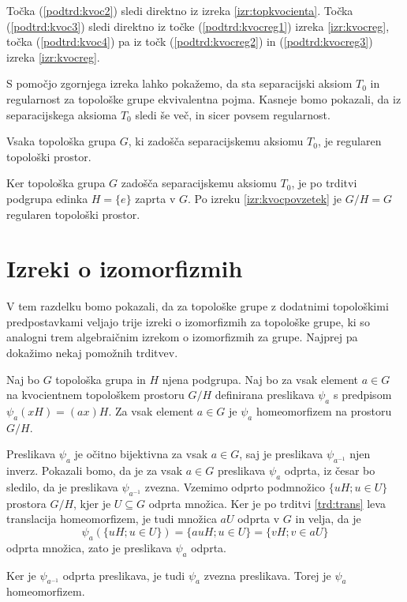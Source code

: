 \documentclass[mat1]{fmfdelo}
\begin{document}
\begin{dokaz}
Točka (\ref{podtrd:kvoc2}) sledi direktno iz izreka \ref{izr:topkvocienta}.
Točka (\ref{podtrd:kvoc3}) sledi direktno iz točke (\ref{podtrd:kvocreg1}) izreka \ref{izr:kvocreg}, točka (\ref{podtrd:kvoc4}) pa iz točk (\ref{podtrd:kvocreg2}) in (\ref{podtrd:kvocreg3}) izreka \ref{izr:kvocreg}.
\end{dokaz}

S pomočjo zgornjega izreka lahko pokažemo, da sta separacijski aksiom $T_0$ in regularnost za topološke grupe ekvivalentna pojma. Kasneje bomo pokazali, da iz separacijskega aksioma $T_0$ sledi še več, in sicer povsem regularnost.

\begin{posledica}\label{izr:t3}
	Vsaka topološka grupa $G$, ki zadošča separacijskemu aksiomu $T_0$, je regularen topološki prostor.
\end{posledica}

\begin{dokaz}
Ker topološka grupa $G$ zadošča separacijskemu aksiomu $T_0$, je po trditvi podgrupa edinka $H = \lbrace e \rbrace$ zaprta v $G$. Po izreku \ref{izr:kvocpovzetek} je $G/H = G$ regularen topološki prostor.
\end{dokaz}

\section{Izreki o izomorfizmih}
V tem razdelku bomo pokazali, da za topološke grupe z dodatnimi topološkimi predpostavkami veljajo trije izreki o izomorfizmih za topološke grupe, ki so analogni trem algebraičnim izrekom o izomorfizmih za grupe. Najprej pa dokažimo nekaj pomožnih trditvev.

\begin{trditev}\label{trd:homogenkvoc}
	Naj bo $G$ topološka grupa in $H$ njena podgrupa. Naj bo za vsak element $a \in G$ na kvocientnem topološkem prostoru $G/H$ definirana preslikava $\psi_a$ s predpisom $\psi_a(xH) = (ax)H$.
	Za vsak element $a \in G$ je $\psi_a$ homeomorfizem na prostoru $G/H$.
\end{trditev}

\begin{dokaz}
Preslikava $\psi_a$ je očitno bijektivna za vsak $a \in G$, saj je preslikava $\psi_{a^{-1}}$ njen inverz. Pokazali bomo, da je za vsak $a \in G$ preslikava $\psi_a$ odprta, iz česar bo sledilo, da je preslikava $\psi_{a^{-1}}$ zvezna.
Vzemimo odprto podmnožico $\lbrace uH ; u \in U \rbrace$ prostora $G/H$, kjer je $U \subseteq G$ odprta množica. 
Ker je po trditvi \ref{trd:trans} leva translacija homeomorfizem, je tudi množica $aU$ odprta v $G$ in velja, da je
\[ \psi_a(\lbrace uH ; u \in U \rbrace) = \lbrace auH ; u \in U \rbrace = \lbrace vH ; v \in aU \rbrace \]
odprta množica, zato je preslikava $\psi_a$ odprta.

Ker je $\psi_{a^{-1}}$ odprta preslikava, je tudi $\psi_a$ zvezna preslikava. Torej je $\psi_a$ homeomorfizem.
\end{dokaz}
\end{document}

